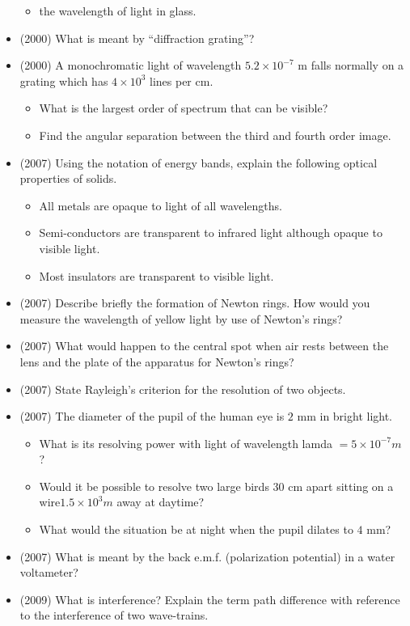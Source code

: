 \documentclass{article}
\begin{document}
\begin{itemize}
\begin{itemize}
\item the wavelength of light in glass.
\end{itemize}
\item (2000)  What is meant by “diffraction grating”?
\item (2000)  A monochromatic light of wavelength $ 5.2 \times 10^{-7}$ m falls normally on a grating which has $ 4 \times 10^{3}$ lines per cm.
 \begin{itemize}
\item What is the largest order of spectrum that can be visible?
\item Find the angular separation between the third and fourth order image.
\end{itemize}
\item (2007)  Using the notation of energy bands, explain the following optical properties of solids.
 \begin{itemize}
\item  All metals are opaque to light of all wavelengths.
\item  Semi-conductors are transparent to infrared light although opaque to visible light.
\item  Most insulators are transparent to visible light.
\end{itemize}
\item (2007)  Describe briefly the formation of Newton rings. How would you measure the wavelength of yellow light by use of Newton’s rings? 
\item (2007)  What would happen to the central spot when air rests between the lens and the plate of the apparatus for Newton’s rings? 
\item (2007)  State Rayleigh’s criterion for the resolution of two objects. 
\item (2007)  The diameter of the pupil of the human eye is $ 2$ mm in bright light.
 \begin{itemize}
\item What is its resolving power with light of wavelength lamda $ =5 \times 10^{-7}m$ ? 
\item Would it be possible to resolve two large birds $ 30$ cm apart sitting on a wire$ 1.5 \times 10^{3}m$ away at daytime? 
\item What would the situation be at night when the pupil dilates to $ 4$ mm? 
\end{itemize}
\item (2007)  What is meant by the back e.m.f. (polarization potential) in a water voltameter? 
\item (2009)  What is interference?  Explain the term path difference with reference to the interference of two wave-trains.

\end{itemize}
\end{document}
